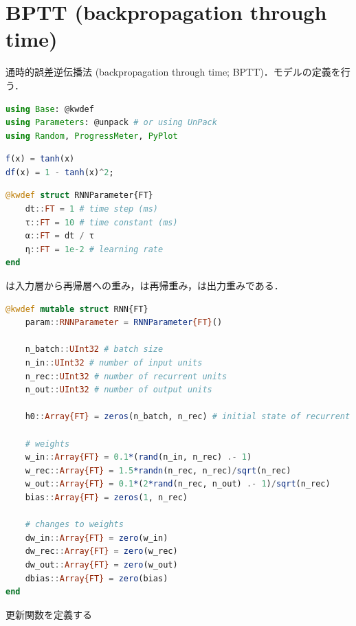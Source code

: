 \section{BPTT (backpropagation through time)}
通時的誤差逆伝播法 (backpropagation through time; BPTT)．モデルの定義を行う．
\begin{lstlisting}[language=julia]
using Base: @kwdef
using Parameters: @unpack # or using UnPack
using Random, ProgressMeter, PyPlot
\end{lstlisting}
\begin{lstlisting}[language=julia]
f(x) = tanh(x)
df(x) = 1 - tanh(x)^2;
\end{lstlisting}
\begin{lstlisting}[language=julia]
@kwdef struct RNNParameter{FT}
    dt::FT = 1 # time step (ms)
    τ::FT = 10 # time constant (ms)
    α::FT = dt / τ 
    η::FT = 1e-2 # learning rate
end
\end{lstlisting}
は入力層から再帰層への重み，は再帰重み，は出力重みである．
\begin{lstlisting}[language=julia]
@kwdef mutable struct RNN{FT}
    param::RNNParameter = RNNParameter{FT}()
    
    n_batch::UInt32 # batch size
    n_in::UInt32 # number of input units
    n_rec::UInt32 # number of recurrent units
    n_out::UInt32 # number of output units
    
    h0::Array{FT} = zeros(n_batch, n_rec) # initial state of recurrent units

    # weights
    w_in::Array{FT} = 0.1*(rand(n_in, n_rec) .- 1)
    w_rec::Array{FT} = 1.5*randn(n_rec, n_rec)/sqrt(n_rec)
    w_out::Array{FT} = 0.1*(2*rand(n_rec, n_out) .- 1)/sqrt(n_rec)
    bias::Array{FT} = zeros(1, n_rec)
    
    # changes to weights
    dw_in::Array{FT} = zero(w_in)
    dw_rec::Array{FT} = zero(w_rec)
    dw_out::Array{FT} = zero(w_out)
    dbias::Array{FT} = zero(bias)
end
\end{lstlisting}
更新関数を定義する
